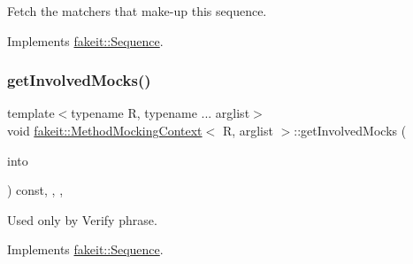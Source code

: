 Fetch the matchers that make-\/up this sequence. 



Implements \mbox{\hyperlink{classfakeit_1_1Sequence_aa1a1e4ad2fcac3379ba38f250bf06884}{fakeit\+::\+Sequence}}.

\mbox{\label{classfakeit_1_1MethodMockingContext_ac66ba7b51a3c845b8fe8f2fa0f5f5ff0}} 
\subsubsection{\texorpdfstring{getInvolvedMocks()}{getInvolvedMocks()}\hspace{0.1cm}{\footnotesize\ttfamily [1/9]}}
{\footnotesize\ttfamily template$<$typename R, typename ... arglist$>$ \\
void \mbox{\hyperlink{classfakeit_1_1MethodMockingContext}{fakeit\+::\+Method\+Mocking\+Context}}$<$ R, arglist $>$\+::get\+Involved\+Mocks (\begin{DoxyParamCaption}\item[{std\+::vector$<$ \mbox{\hyperlink{structfakeit_1_1ActualInvocationsSource}{Actual\+Invocations\+Source}} $\ast$ $>$ \&}]{into }\end{DoxyParamCaption}) const\hspace{0.3cm}{\ttfamily [inline]}, {\ttfamily [override]}, {\ttfamily [protected]}, {\ttfamily [virtual]}}



Used only by Verify phrase. 



Implements \mbox{\hyperlink{classfakeit_1_1Sequence_a4af96a0de0fa659fe826431e4d61757a}{fakeit\+::\+Sequence}}.

\mbox{\label{classfakeit_1_1MethodMockingContext_ac66ba7b51a3c845b8fe8f2fa0f5f5ff0}} 
